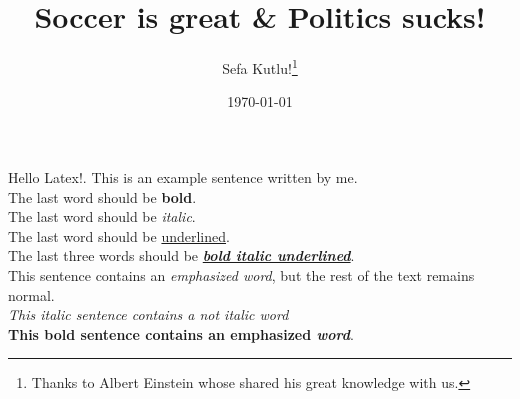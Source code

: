 % 
\title{Soccer is great \& Politics sucks!}   
\author{Sefa Kutlu!\thanks{Thanks to Albert Einstein whose shared his great knowledge with us. }}
\date{\today}                           


    \maketitle
    Hello Latex!. This is an example sentence written by me.
    \\
    The last word should be \textbf{bold}.      
    \\
    The last word should be \textit{italic}.
    \\
    The last word should be \underline{underlined}.
    \\
    The last three words should be \textbf{\textit{\underline{bold italic underlined}}}.
    \\
    This sentence contains an \emph{emphasized word}, but the rest of the text remains normal.
    \\
    \textit{This italic sentence contains a not italic \emph{word}}
    \\
    \textbf{This bold sentence contains an emphasized \emph{word}}.
    \\


